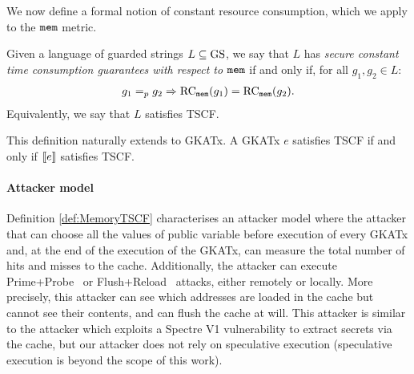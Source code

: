 We now define a formal notion of constant resource consumption, which we apply to the $\texttt{mem}$ metric.
\begin{definition}
    \label{def:MemoryTSCF}
Given a language of guarded strings $L\subseteq \text{GS}$, we say that $L$ has \emph{secure constant time consumption guarantees with respect to $\texttt{mem}$} if and only if, for all $g_1, g_2 \in L:$
\begin{align*}
\label{eq:WSRC}
g_1=_p g_2\Rightarrow\text{RC}_{\texttt{mem}}(g_1)=\text{RC}_{\texttt{mem}}(g_2).
\end{align*}
Equivalently, we say that $L$ satisfies TSCF.
\end{definition}
This definition naturally extends to GKATx. A GKATx $e$ satisfies TSCF if and only if $\llbracket e\rrbracket$ satisfies TSCF. 



\paragraph*{Attacker model} Definition \ref{def:MemoryTSCF} characterises an attacker model where 
the attacker that can choose all the values of public variable before execution of every GKATx and, at the end of the execution of the GKATx, can measure the total number of hits and misses to the cache. Additionally, the attacker can execute Prime+Probe~\cite{prime-probe} or Flush+Reload~\cite{Flush+Reload} attacks, either remotely or locally. More precisely, this attacker can see which addresses are loaded in the cache but cannot see their contents, and can flush the cache at will. This attacker is similar to the attacker which exploits a Spectre V1 vulnerability to extract secrets via the cache, but our attacker does not rely on speculative execution (speculative execution is beyond the scope of this work). 

